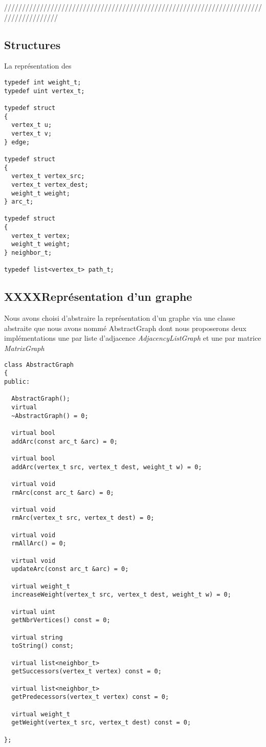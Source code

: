 ///////////////////////////////////////////////////////////////////////////////////////

\subsection{Structures}

La représentation des 

\begin{verbatim}
typedef int weight_t;
typedef uint vertex_t;

typedef struct
{
  vertex_t u;
  vertex_t v;
} edge;

typedef struct
{
  vertex_t vertex_src;
  vertex_t vertex_dest;
  weight_t weight;
} arc_t;

typedef struct
{
  vertex_t vertex;
  weight_t weight;
} neighbor_t;
  
typedef list<vertex_t> path_t;

\end{verbatim}

\subsection{XXXXReprésentation d'un graphe}

Nous avons choisi d'abstraire la représentation d'un graphe via une
classe abstraite que nous avons nommé AbstractGraph dont nous proposerons
deux implémentations une par liste d'adjacence \emph{AdjacencyListGraph} 
et une par matrice \emph{MatrixGraph}

\begin{verbatim}
class AbstractGraph
{
public:

  AbstractGraph();
  virtual
  ~AbstractGraph() = 0;

  virtual bool
  addArc(const arc_t &arc) = 0;

  virtual bool
  addArc(vertex_t src, vertex_t dest, weight_t w) = 0;

  virtual void
  rmArc(const arc_t &arc) = 0;

  virtual void
  rmArc(vertex_t src, vertex_t dest) = 0;

  virtual void
  rmAllArc() = 0;

  virtual void
  updateArc(const arc_t &arc) = 0;

  virtual weight_t
  increaseWeight(vertex_t src, vertex_t dest, weight_t w) = 0;

  virtual uint
  getNbrVertices() const = 0;

  virtual string
  toString() const;

  virtual list<neighbor_t>
  getSuccessors(vertex_t vertex) const = 0;

  virtual list<neighbor_t>
  getPredecessors(vertex_t vertex) const = 0;

  virtual weight_t
  getWeight(vertex_t src, vertex_t dest) const = 0;

};

\end{verbatim}

